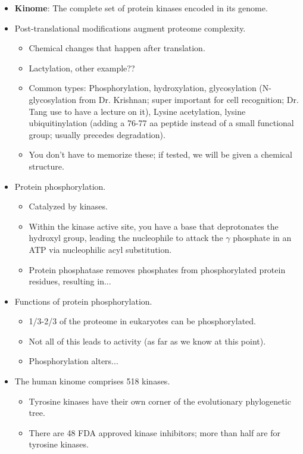 \documentclass[../notes.tex]{subfiles}
\begin{document}
\begin{itemize}
    \item \textbf{Kinome}: The complete set of protein kinases encoded in its genome.
    \item Post-translational modifications augment proteome complexity.
    \begin{itemize}
        \item Chemical changes that happen after translation.
        \item Lactylation, other example??
        \item Common types: Phosphorylation, hydroxylation, glycosylation (N-glycosylation from Dr. Krishnan; super important for cell recognition; Dr. Tang use to have a lecture on it), Lysine acetylation, lysine ubiquitinylation (adding a 76-77 aa peptide instead of a small functional group; usually precedes degradation).
        \item You don't have to memorize these; if tested, we will be given a chemical structure.
    \end{itemize}
    \item Protein phosphorylation.
    \begin{itemize}
        \item Catalyzed by kinases.
        \item Within the kinase active site, you have a base that deprotonates the hydroxyl group, leading the  nucleophile to attack the $\gamma$ phosphate in an ATP via nucleophilic acyl substitution.
        \item Protein phosphatase removes phosphates from phosphorylated protein residues, resulting in...
    \end{itemize}
    \item Functions of protein phosphorylation.
    \begin{itemize}
        \item 1/3-2/3 of the proteome in eukaryotes can be phosphorylated.
        \item Not all of this leads to activity (as far as we know at this point).
        \item Phosphorylation alters...
    \end{itemize}
    \item The human kinome comprises 518 kinases.
    \begin{itemize}
        \item Tyrosine kinases have their own corner of the evolutionary phylogenetic tree.
        \item There are 48 FDA approved kinase inhibitors; more than half are for tyrosine kinases.

\end{itemize}
\end{itemize}
\end{document}
